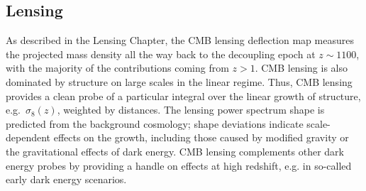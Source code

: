 

\subsection{Lensing}

As described in the Lensing Chapter, the CMB lensing deflection map measures the projected mass density all the way back to the decoupling epoch at $z \sim 1100$, with the majority of the contributions coming from $z > 1$.  CMB lensing is also dominated by structure on large scales in the linear regime.  Thus,  CMB lensing provides a clean probe of a particular integral over the linear growth of structure,
e.g.~$\sigma_8(z)$,
weighted by distances. The lensing power spectrum shape is predicted from the background cosmology; shape deviations indicate scale-dependent effects on the growth, including those caused by modified gravity or the 
gravitational effects of dark energy.  CMB lensing complements other dark energy probes by providing
a handle on effects at high redshift, e.g. in so-called early dark energy scenarios.

